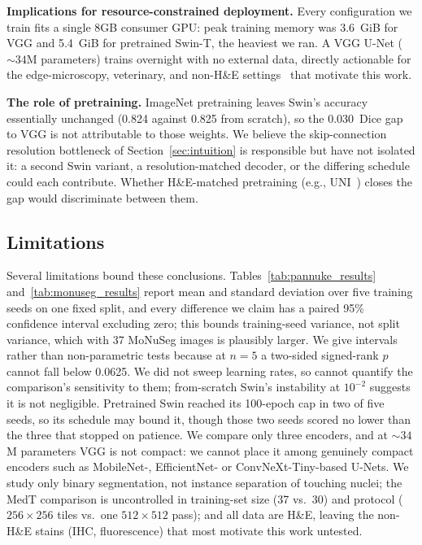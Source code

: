 \documentclass[runningheads]{llncs}
\begin{document}
\noindent\textbf{Implications for resource-constrained deployment.} Every configuration we train fits a single 8GB consumer GPU: peak training memory was 3.6~GiB for VGG and 5.4~GiB for pretrained Swin-T, the heaviest we ran. A VGG U-Net (${\sim}34$M parameters) trains overnight with no external data, directly actionable for the edge-microscopy, veterinary, and non-H\&E settings~\cite{xiao2025review,neal2025artificial} that motivate this work.

\noindent\textbf{The role of pretraining.} ImageNet pretraining leaves Swin's
accuracy essentially unchanged (0.824 against 0.825 from scratch), so the
0.030~Dice gap to VGG is not attributable to those weights. We believe the
skip-connection resolution bottleneck of Section~\ref{sec:intuition} is
responsible but have not isolated it: a second Swin variant, a resolution-matched
decoder, or the differing schedule could each contribute. Whether H\&E-matched
pretraining (e.g., UNI~\cite{chen2024uni}) closes the gap would discriminate
between them.

\subsection{Limitations}

Several limitations bound these conclusions. Tables~\ref{tab:pannuke_results} and~\ref{tab:monuseg_results} report mean and standard deviation over five training seeds on one fixed split, and every difference we claim has a paired 95\% confidence interval excluding zero; this bounds training-seed variance, not split variance, which with 37 MoNuSeg images is plausibly larger. We give intervals rather than non-parametric tests because at $n{=}5$ a two-sided signed-rank $p$ cannot fall below 0.0625. We did not sweep learning rates, so cannot quantify the comparison's sensitivity to them; from-scratch Swin's instability at $10^{-2}$ suggests it is not negligible. Pretrained Swin reached its 100-epoch cap in two of five seeds, so its schedule may bound it, though those two seeds scored no lower than the three that stopped on patience. We compare only three encoders, and at ${\sim}34$M parameters VGG is not compact: we cannot place it among genuinely compact encoders such as MobileNet-, EfficientNet- or ConvNeXt-Tiny-based U-Nets. We study only binary segmentation, not instance separation of touching nuclei; the MedT comparison is uncontrolled in training-set size (37 vs.\ 30) and protocol ($256\times256$ tiles vs.\ one $512\times512$ pass); and all data are H\&E, leaving the non-H\&E stains (IHC, fluorescence) that most motivate this work untested.
\end{document}
